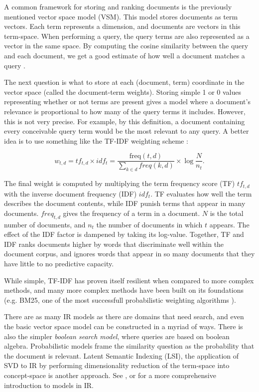 A common framework for storing and ranking documents is the previously mentioned vector space model (VSM).
This model stores documents as term vectors. Each term represents a dimension, and documents are
vectors in this term-space. When performing a query, the query terms are also represented as a vector
in the same space. By computing the cosine similarity between the query and each document,
we get a good estimate of how well a document matches a query \citep[p29]{Baeza-Yates1999}.

The next question is what to store at each (document, term) coordinate in the vector space
(called the document-term weights).
Storing simple 1 or 0 values representing whether or not terms are present gives a model 
where a document's relevance is proportional to how 
many of the query terms it includes. However, this is not very precise. 
For example, by this definition, a document containing every conceivable query term
would be the most relevant to any query.
A better idea is to use something like the TF-IDF weighting scheme \citep[p29]{Baeza-Yates1999}:

\begin{equation*}
  w_{t,d} = tf_{t,d} \times idf_{t}
          = \frac{ \mathrm{freq}(t,d) }{ \sum_{k \in d} freq(k,d) } \times 
            \log \frac{N}{n_{t}}.
\end{equation*}

The final weight is computed by multiplying the term frequency score (TF) $tf_{t,d}$ with the 
inverse document frequency (IDF) $idf_{t}$. TF evaluates how well the term describes the document contents,
while IDF punish terms that appear in many documents. 
$freq_{t,d}$ gives the frequency of a term in a document. $N$ is the total number of documents,
and $n_{t}$ the number of documents in which $t$ appears. The effect of the IDF factor is dampened by taking its
log-value. Together, TF and IDF ranks documents higher by words that discriminate well within the document corpus,
and ignores words that appear in so many documents that they have little to no predictive capacity.

While simple, TF-IDF has proven itself resilient when compared to more complex methods,
and many more complex methods have been built on its foundations (e.g. BM25, one of the most successfull
probabilistic weighting algorithms \citep{Robertson2010}).

There are as many IR models as there are domains that need search,
and even the basic vector space model can be constructed in a myriad of ways. There is also the simpler 
\emph{boolean search model}, where queries are based on boolean algebra. Probabilistic models
frame the similarity question as the probability that the document is relevant. 
Latent Semantic Indexing (LSI), the application of SVD to IR by performing dimensionality reduction of the term-space
into concept-space is another approach.
See \cite{Manning2008}, \cite{Robertson2010} or \cite{Baeza-Yates1999} for a more comprehensive introduction to models in IR.

